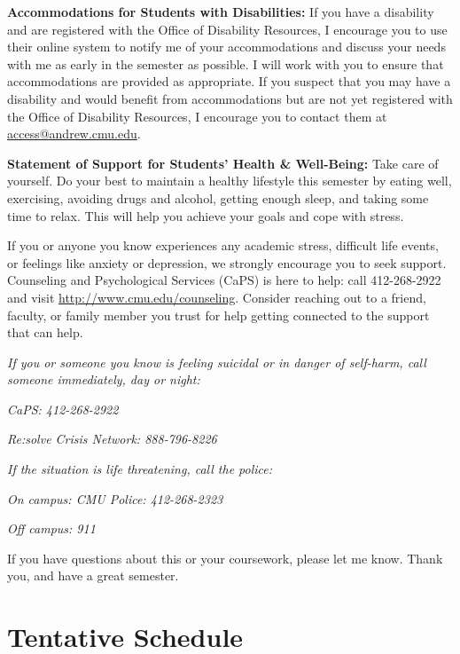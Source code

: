 \documentclass[11pt,letterpaper]{article}
\begin{document}
\medskip
\noindent
\textbf{Accommodations for Students with Disabilities:} If you have a disability and are registered with the Office of Disability Resources, I encourage you to use their online system to notify me of your accommodations and discuss your needs with me as early in the semester as possible. I will work with you to ensure that accommodations are provided as appropriate. If you suspect that you may have a disability and would benefit from accommodations but are not yet registered with the Office of Disability Resources, I encourage you to contact them at \href{mailto:access@andrew.cmu.edu}{access@andrew.cmu.edu}.

\medskip
\noindent
\textbf{Statement of Support for Students' Health \& Well-Being:} Take care of yourself. Do your best to maintain a healthy lifestyle this semester by eating well, exercising, avoiding drugs and alcohol, getting enough sleep, and taking some time to relax. This will help you achieve your goals and cope with stress.

\medskip
\noindent
If you or anyone you know experiences any academic stress, difficult life events, or feelings like anxiety or depression, we strongly encourage you to seek support. Counseling and Psychological Services (CaPS) is here to help: call 412-268-2922 and visit \href{http://www.cmu.edu/counseling}{http://www.cmu.edu/counseling}. Consider reaching out to a friend, faculty, or family member you trust for help getting connected to the support that can help.

\medskip
\noindent
\textit{If you or someone you know is feeling suicidal or in danger of self-harm, call someone immediately, day or night:}

\textit{CaPS: 412-268-2922}

\textit{Re:solve Crisis Network: 888-796-8226}

\medskip
\noindent
\textit{If the situation is life threatening, call the police:}

\textit{On campus: CMU Police: 412-268-2323}

\textit{Off campus: 911}

\medskip
\noindent
If you have questions about this or your coursework, please let me know. Thank you, and have a great semester.


\section*{Tentative Schedule}
\end{document}
